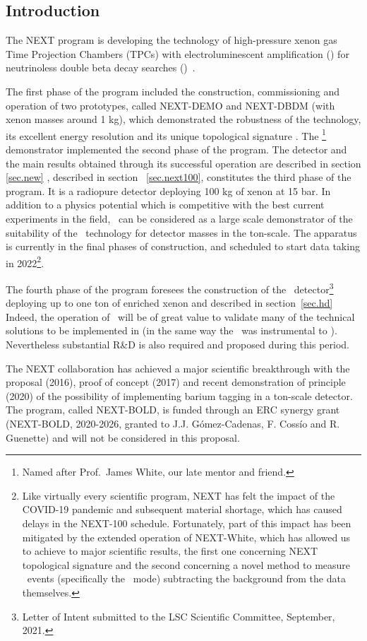 \subsection{Introduction}

The NEXT program is developing the technology of high-pressure xenon gas Time Projection Chambers (TPCs) with electroluminescent amplification (\HPXeEL) for neutrinoless double beta decay searches (\bbonu)~\cite{Gomez-Cadenas:2019sfa}. 

\indent

The first phase of the program included the construction, commissioning and operation of two prototypes, called NEXT-DEMO and NEXT-DBDM (with xenon masses around 1 kg), which demonstrated the robustness of the technology, its excellent energy resolution and its unique topological signature \cite{Alvarez:2012xda, Alvarez:2013gxa, Alvarez:2012hh, Ferrario:2015kta}. The \NEW\footnote{Named after Prof.~James White, our late mentor and friend.} demonstrator implemented the second phase of the program. The detector and the main results obtained through its successful operation are described in section \ref{sec.new} \Next, described in section ~\ref{sec.next100}, constitutes the third phase of the program. It is a radiopure detector deploying 100 kg of xenon at 15 bar. In addition to a physics potential which is competitive with the best current experiments in the field, \Next\ can be considered as a large scale demonstrator of the suitability of the \HPXeEL\ technology for detector masses in the ton-scale. The apparatus is currently in the final phases of construction, and scheduled to start data taking in 2022\footnote{
Like virtually every scientific program, NEXT has felt the impact of the COVID-19 pandemic and subsequent material shortage, which has caused delays in the NEXT-100 schedule. Fortunately, part of this impact has been mitigated by the extended operation of NEXT-White, which has allowed us to achieve to major scientific results, the first one concerning NEXT topological signature and the second concerning a novel method to measure \bb\ events
(specifically the \bbtnu\ mode) subtracting the background from the data themselves.}. 

\indent

The fourth phase of the program foresees the construction of the \NHD\ detector\footnote{Letter of Intent submitted to the LSC Scientific Committee, September,  2021.} deploying up to one ton of enriched xenon and described in section~\ref{sec.hd} Indeed, the operation of \Next\ will be of great value to validate many of the technical solutions to be implemented in \NHD (in the same way the \NEW\ was instrumental to \Next). Nevertheless substantial R\&D is also required and proposed during this period. 

\indent

The NEXT collaboration has achieved a major scientific breakthrough with the proposal (2016), proof of concept (2017) and recent demonstration of principle (2020) of the possibility of implementing barium tagging in a ton-scale detector. The program, called NEXT-BOLD, is funded through an ERC synergy grant (NEXT-BOLD, 2020-2026, granted to J.J. G\'omez-Cadenas, F. Coss\'io and R. Guenette) and will not be considered in this proposal. 
